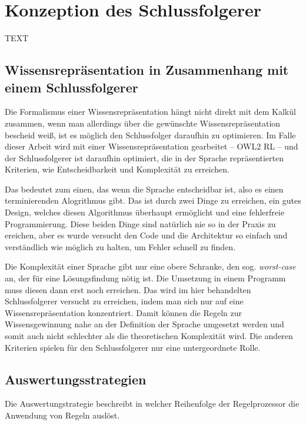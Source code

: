 \chapter{Konzeption des Schlussfolgerer}

TEXT



\section{Wissensrepräsentation in Zusammenhang mit einem Schlussfolgerer}

Die Formalismus einer Wissensrepräsentation hängt nicht direkt mit dem Kalkül zusammen, wenn man allerdings über die gewünschte Wissensrepräsentation bescheid weiß, ist es möglich den Schlussfolger daraufhin zu optimieren. Im Falle dieser Arbeit wird mit einer Wissensrepräsentation gearbeitet -- OWL2 RL -- und der Schlussfolgerer ist daraufhin optimiert, die in der Sprache repräsentierten Kriterien, wie Entscheidbarkeit und Komplexität zu erreichen.

Das bedeutet zum einen, das wenn die Sprache entscheidbar ist, also es einen terminierenden Alogrithmus gibt. Das ist durch zwei Dinge zu erreichen, ein gutes Design, welches diesen Algorithmus überhaupt ermöglicht und eine fehlerfreie Programmierung. Diese beiden Dinge sind natürlich nie so in der Praxis zu ereichen, aber es wurde versucht den Code und die Architektur so einfach und verständlich wie möglich zu halten, um Fehler schnell zu finden.

Die Komplexität einer Sprache gibt nur eine obere Schranke, den sog. \emph{worst-case} an, der für eine Lösungsfindung nötig ist. Die Umsetzung in einem Programm muss diesen dann erst noch erreichen. Das wird im hier behandelten Schlussfolgerer versucht zu erreichen, indem man sich nur auf eine Wissensrepräsentation konzentriert. Damit können die Regeln zur Wissensgewinnung nahe an der Definition der Sprache umgesetzt werden und somit auch nicht schlechter als die theoretischen Komplexität wird.
Die anderen Kriterien spielen für den Schlussfolgerer nur eine untergeordnete Rolle.





\section{Auswertungsstrategien}
Die Auswertungstrategie beschreibt in welcher Reihenfolge der Regelprozessor die Anwendung von Regeln auslöst. 

